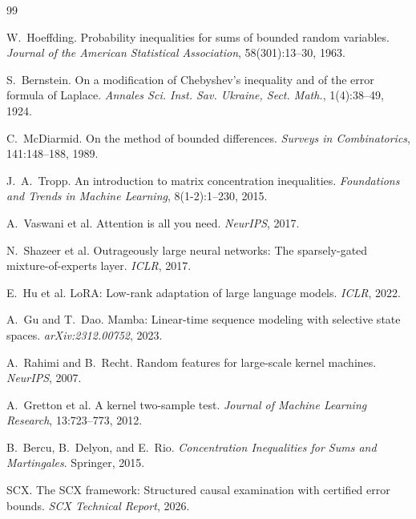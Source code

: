 \documentclass[12pt,a4paper]{article}
\theoremstyle{definition}
\begin{document}
\begin{thebibliography}{99}

W.~Hoeffding.
\newblock Probability inequalities for sums of bounded random variables.
\newblock \emph{Journal of the American Statistical Association}, 58(301):13--30, 1963.

S.~Bernstein.
\newblock On a modification of Chebyshev's inequality and of the error formula of Laplace.
\newblock \emph{Annales Sci. Inst. Sav. Ukraine, Sect. Math.}, 1(4):38--49, 1924.

C.~McDiarmid.
\newblock On the method of bounded differences.
\newblock \emph{Surveys in Combinatorics}, 141:148--188, 1989.

J.~A.~Tropp.
\newblock An introduction to matrix concentration inequalities.
\newblock \emph{Foundations and Trends in Machine Learning}, 8(1-2):1--230, 2015.

A.~Vaswani et al.
\newblock Attention is all you need.
\newblock \emph{NeurIPS}, 2017.

N.~Shazeer et al.
\newblock Outrageously large neural networks: The sparsely-gated mixture-of-experts layer.
\newblock \emph{ICLR}, 2017.

E.~Hu et al.
\newblock LoRA: Low-rank adaptation of large language models.
\newblock \emph{ICLR}, 2022.

A.~Gu and T.~Dao.
\newblock Mamba: Linear-time sequence modeling with selective state spaces.
\newblock \emph{arXiv:2312.00752}, 2023.

A.~Rahimi and B.~Recht.
\newblock Random features for large-scale kernel machines.
\newblock \emph{NeurIPS}, 2007.

A.~Gretton et al.
\newblock A kernel two-sample test.
\newblock \emph{Journal of Machine Learning Research}, 13:723--773, 2012.

B.~Bercu, B.~Delyon, and E.~Rio.
\newblock \emph{Concentration Inequalities for Sums and Martingales}.
\newblock Springer, 2015.

SCX.
\newblock The SCX framework: Structured causal examination with certified error bounds.
\newblock \emph{SCX Technical Report}, 2026.

\end{thebibliography}
\end{document}
